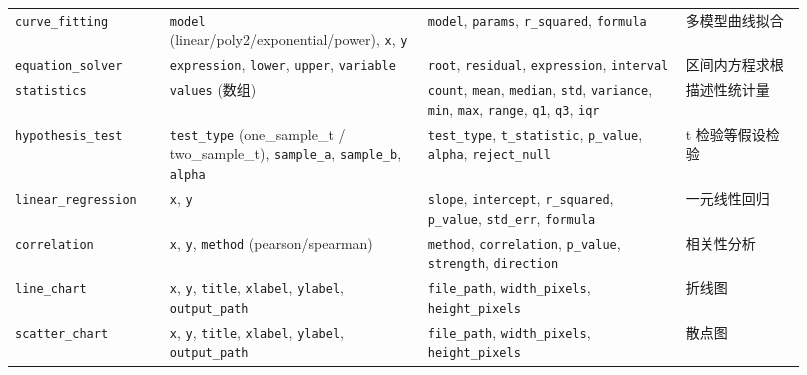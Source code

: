 {\begin{longtable}{
    p{0.18\linewidth}
    p{0.30\linewidth}
    p{0.30\linewidth}
    p{0.14\linewidth}
    }
    \texttt{curve\_fitting}
    &
    \texttt{model}
    (linear/poly2/exponential/power),
    \texttt{x},
    \texttt{y}
    &
    \texttt{model},
    \texttt{params},
    \texttt{r\_squared},
    \texttt{formula}
    &
    多模型曲线拟合
    \\
    
    \texttt{equation\_solver}
    &
    \texttt{expression},
    \texttt{lower},
    \texttt{upper},
    \texttt{variable}
    &
    \texttt{root},
    \texttt{residual},
    \texttt{expression},
    \texttt{interval}
    &
    区间内方程求根
    \\
    
    \texttt{statistics}
    &
    \texttt{values} (数组)
    &
    \texttt{count},
    \texttt{mean},
    \texttt{median},
    \texttt{std},
    \texttt{variance},
    \texttt{min},
    \texttt{max},
    \texttt{range},
    \texttt{q1},
    \texttt{q3},
    \texttt{iqr}
    &
    描述性统计量
    \\
    
    \texttt{hypothesis\_test}
    &
    \texttt{test\_type}
    (one\_sample\_t /
    two\_sample\_t),
    \texttt{sample\_a},
    \texttt{sample\_b},
    \texttt{alpha}
    &
    \texttt{test\_type},
    \texttt{t\_statistic},
    \texttt{p\_value},
    \texttt{alpha},
    \texttt{reject\_null}
    &
    t 检验等假设检验
    \\
    
    \texttt{linear\_regression}
    &
    \texttt{x},
    \texttt{y}
    &
    \texttt{slope},
    \texttt{intercept},
    \texttt{r\_squared},
    \texttt{p\_value},
    \texttt{std\_err},
    \texttt{formula}
    &
    一元线性回归
    \\
    
    \texttt{correlation}
    &
    \texttt{x},
    \texttt{y},
    \texttt{method}
    (pearson/spearman)
    &
    \texttt{method},
    \texttt{correlation},
    \texttt{p\_value},
    \texttt{strength},
    \texttt{direction}
    &
    相关性分析
    \\
    
    \texttt{line\_chart}
    &
    \texttt{x},
    \texttt{y},
    \texttt{title},
    \texttt{xlabel},
    \texttt{ylabel},
    \texttt{output\_path}
    &
    \texttt{file\_path},
    \texttt{width\_pixels},
    \texttt{height\_pixels}
    &
    折线图
    \\
    
    \texttt{scatter\_chart}
    &
    \texttt{x},
    \texttt{y},
    \texttt{title},
    \texttt{xlabel},
    \texttt{ylabel},
    \texttt{output\_path}
    &
    \texttt{file\_path},
    \texttt{width\_pixels},
    \texttt{height\_pixels}
    &
    散点图
    \\
    

\end{longtable}}
